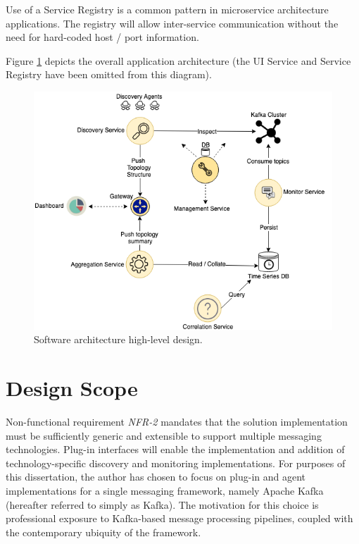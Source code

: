Use of a Service Registry is a common pattern in microservice architecture applications. The registry will allow inter-service communication without the need for hard-coded host / port information.

Figure \ref{arch_high_level} depicts the overall application architecture (the UI Service and Service Registry have been omitted from this diagram).

\vspace{5mm}


\begin{figure}[H]
	\centering  
	\includegraphics[width=\linewidth]{figures/design/arch_high_level.png}
	\caption{Software architecture high-level design.}
	\label{arch_high_level}
\end{figure}

\section{Design Scope}

Non-functional requirement \textit{NFR-2} mandates that the solution implementation must be sufficiently generic and extensible to support multiple messaging technologies. Plug-in interfaces will enable the implementation and addition of technology-specific discovery and monitoring implementations. For purposes of this dissertation, the author has chosen to focus on plug-in and agent implementations for a single messaging framework, namely Apache Kafka (hereafter referred to simply as Kafka)\cite{ApacheKafka}. The motivation for this choice is professional exposure to Kafka-based message processing pipelines, coupled with the contemporary ubiquity of the framework.


